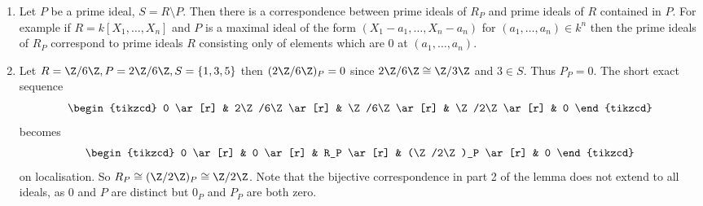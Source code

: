 \documentclass[a4paper]{article}
\begin{document}
\begin{eg}\leavevmode
  \begin{enumerate}
  \item Let \(P\) be a prime ideal, \(S = R \setminus P\). Then there is a correspondence between prime ideals of \(R_P\) and prime ideals of \(R\) contained in \(P\). For example if \(R = k[X_1, \dots, X_n]\) and \(P\) is a maximal ideal of the form \((X_1 - a_1, \dots, X_n - a_n)\) for \((a_1, \dots, a_n) \in k^n\) then the prime ideals of \(R_P\) correspond to prime ideals \(R\) consisting only of elements which are \(0\) at \((a_1, \dots, a_n)\).
  \item Let \(R = \Z/6\Z, P = 2\Z/6\Z, S = \{1, 3, 5\}\) then \((2\Z/6\Z)_P = 0\) since \(2\Z/6\Z \cong \Z/3\Z\) and \(3 \in S\). Thus \(P_P = 0\). The short exact sequence
    \[
      \begin{tikzcd}
        0 \ar[r] & 2\Z/6\Z \ar[r] & \Z/6\Z \ar[r] & \Z/2\Z \ar[r] & 0
      \end{tikzcd}
    \]
    becomes
    \[
      \begin{tikzcd}
        0 \ar[r] & 0 \ar[r] & R_P \ar[r] & (\Z/2\Z)_P \ar[r] & 0
      \end{tikzcd}
    \]
    on localisation. So \(R_P \cong (\Z/2\Z)_P \cong \Z/2\Z\). Note that the bijective correspondence in part 2 of the lemma does not extend to all ideals, as \(0\) and \(P\) are distinct but \(0_P\) and \(P_P\) are both zero.
  \end{enumerate}
\end{eg}
\end{document}
